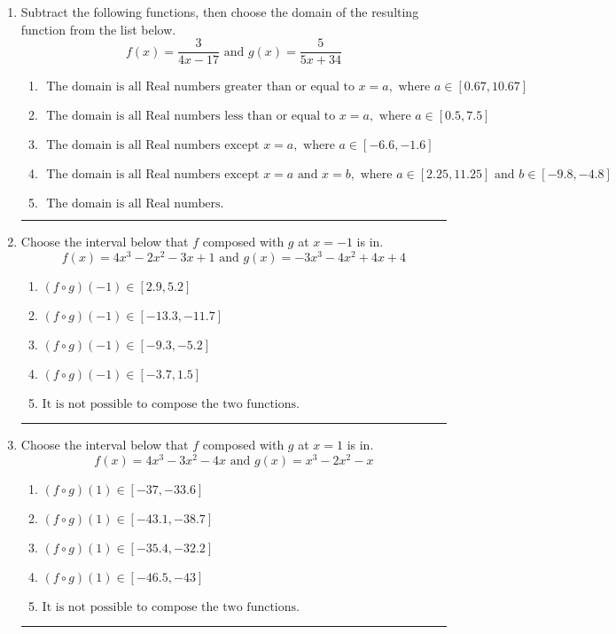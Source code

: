 \documentclass[14pt]{extbook}
\newcommand{\litem}[1]{\item#1\hspace*{-1cm}\rule{\textwidth}{0.4pt}}
\begin{document}
\begin{enumerate}
{\begin{enumerate}[label=\Alph*.]
\end{enumerate} }
\litem{
Subtract the following functions, then choose the domain of the resulting function from the list below.\[ f(x) = \frac{3}{4x-17} \text{ and } g(x) = \frac{5}{5x+34} \]\begin{enumerate}[label=\Alph*.]
\item \( \text{ The domain is all Real numbers greater than or equal to } x = a, \text{ where } a \in [0.67, 10.67] \)
\item \( \text{ The domain is all Real numbers less than or equal to } x = a, \text{ where } a \in [0.5, 7.5] \)
\item \( \text{ The domain is all Real numbers except } x = a, \text{ where } a \in [-6.6, -1.6] \)
\item \( \text{ The domain is all Real numbers except } x = a \text{ and } x = b, \text{ where } a \in [2.25, 11.25] \text{ and } b \in [-9.8, -4.8] \)
\item \( \text{ The domain is all Real numbers. } \)

\end{enumerate} }
\litem{
Choose the interval below that $f$ composed with $g$ at $x=-1$ is in.\[ f(x) = 4x^{3} -2 x^{2} -3 x + 1 \text{ and } g(x) = -3x^{3} -4 x^{2} +4 x + 4 \]\begin{enumerate}[label=\Alph*.]
\item \( (f \circ g)(-1) \in [2.9, 5.2] \)
\item \( (f \circ g)(-1) \in [-13.3, -11.7] \)
\item \( (f \circ g)(-1) \in [-9.3, -5.2] \)
\item \( (f \circ g)(-1) \in [-3.7, 1.5] \)
\item \( \text{It is not possible to compose the two functions.} \)

\end{enumerate} }
\litem{
Choose the interval below that $f$ composed with $g$ at $x=1$ is in.\[ f(x) = 4x^{3} -3 x^{2} -4 x \text{ and } g(x) = x^{3} -2 x^{2} -x \]\begin{enumerate}[label=\Alph*.]
\item \( (f \circ g)(1) \in [-37, -33.6] \)
\item \( (f \circ g)(1) \in [-43.1, -38.7] \)
\item \( (f \circ g)(1) \in [-35.4, -32.2] \)
\item \( (f \circ g)(1) \in [-46.5, -43] \)
\item \( \text{It is not possible to compose the two functions.} \)


\end{enumerate}}
\end{enumerate}
\end{document}
